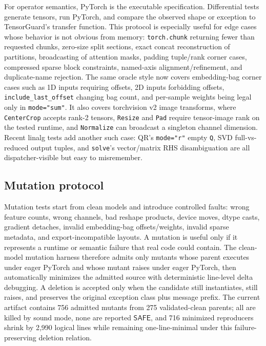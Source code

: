 \documentclass[11pt]{article}
\newcommand{\tg}{TensorGuard}
\newcommand{\safe}{\ensuremath{\mathsf{SAFE}}}
\begin{document}
For operator semantics, PyTorch is the executable specification.  Differential
tests generate tensors, run PyTorch, and compare the observed shape or exception
to \tg{}'s transfer function.  This protocol is especially useful for edge cases
whose behavior is not obvious from memory: \texttt{torch.chunk} returning fewer
than requested chunks, zero-size split sections, exact concat reconstruction of
partitions, broadcasting of attention masks, padding tuple/rank corner cases,
compressed sparse block constraints, named-axis alignment/refinement, and
duplicate-name rejection.  The same oracle style now covers embedding-bag corner
cases such as 1D inputs requiring offsets, 2D inputs forbidding offsets,
\texttt{include\_last\_offset} changing bag count, and per-sample weights being
legal only in \texttt{mode="sum"}.  It also covers torchvision v2 image
transforms, where \texttt{CenterCrop} accepts rank-2 tensors, \texttt{Resize}
and \texttt{Pad} require tensor-image rank on the tested runtime, and
\texttt{Normalize} can broadcast a singleton channel dimension.
Recent linalg tests add another such case: QR's \texttt{mode="r"} empty
\texttt{Q}, SVD full-vs-reduced output tuples, and \texttt{solve}'s vector/matrix
RHS disambiguation are all dispatcher-visible but easy to misremember.

\subsection{Mutation protocol}

Mutation tests start from clean models and introduce controlled faults:
wrong feature counts, wrong channels, bad reshape products, device moves,
dtype casts, gradient detaches, invalid embedding-bag offsets/weights, invalid
sparse metadata, and export-incompatible
layouts.  A mutation is useful only if it represents a runtime or semantic
failure that real code could contain.  The clean-model mutation harness therefore
admits only mutants whose parent executes under eager PyTorch and whose mutant
raises under eager PyTorch, then automatically minimizes the admitted source with
deterministic line-level delta debugging.  A deletion is accepted only when the
candidate still instantiates, still raises, and preserves the original exception
class plus message prefix.  The current artifact contains 756 admitted mutants
from 275 validated-clean parents; all are killed by sound mode, none are reported
\safe{}, and 716 minimized reproducers shrink by 2,990 logical lines while
remaining one-line-minimal under this failure-preserving deletion relation.
\end{document}
